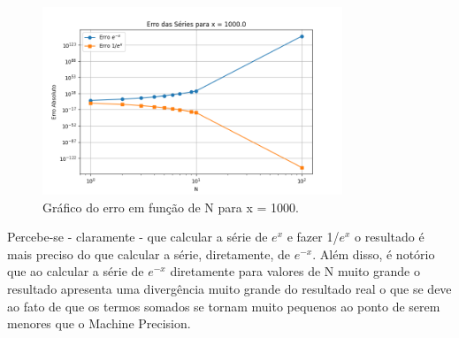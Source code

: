 \documentclass[12pt, a4paper]{article} %
\begin{document}
    \begin{figure}[H]
        \centering
        \includegraphics[width=0.8\textwidth]{../images/erro_x_1000_0.png}
        \caption{Gr\'afico do erro em fun\c{c}\~ao de N para x = 1000.}
    \end{figure}

    Percebe-se - claramente - que calcular a s\'erie de $e^x$ e fazer 1/$e^x$ o resultado \'e mais preciso do que calcular a s\'erie, diretamente, de $e^{-x}$. Al\'em disso, \'e not\'orio que ao calcular a s\'erie de $e^{-x}$  diretamente para valores de N muito grande o resultado apresenta uma diverg\^encia muito grande do resultado real o que se deve ao fato de que os termos somados se tornam muito pequenos ao ponto de serem menores que o Machine Precision.
\end{document}
